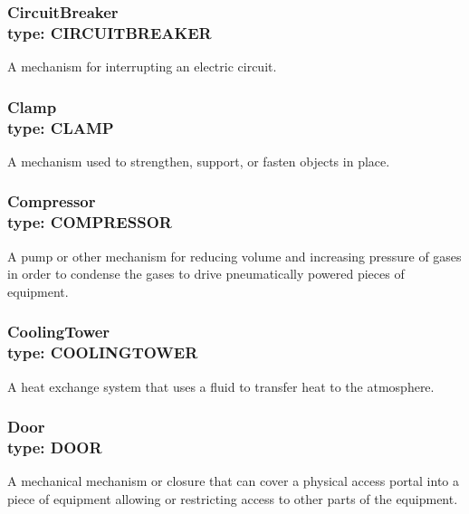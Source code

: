 \subsubsection[CircuitBreaker]{CircuitBreaker \\ {\small type: CIRCUIT\textunderscore BREAKER}}
\label{sec:CircuitBreaker}



A mechanism for interrupting an electric circuit.



\subsubsection[Clamp]{Clamp \\ {\small type: CLAMP}}
\label{sec:Clamp}



A mechanism used to strengthen, support, or fasten objects in place.



\subsubsection[Compressor]{Compressor \\ {\small type: COMPRESSOR}}
\label{sec:Compressor}



A pump or other mechanism for reducing volume and increasing pressure of gases in order to condense the gases to drive pneumatically powered pieces of equipment.



\subsubsection[CoolingTower]{CoolingTower \\ {\small type: COOLING\textunderscore TOWER}}
\label{sec:CoolingTower}



A heat exchange system that uses a fluid to transfer heat to the atmosphere.



\subsubsection[Door]{Door \\ {\small type: DOOR}}




A mechanical mechanism or closure that can cover a physical access portal into a piece of equipment allowing or restricting access to other parts of the equipment.



